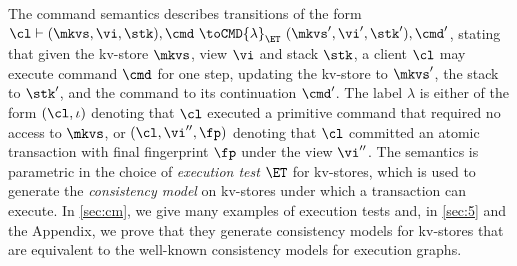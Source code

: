 %
The command semantics describes transitions of the form
$\cl \vdash (\mkvs, \vi, \stk), \cmd \ \toCMD{\lambda}_{\ET} \ (\mkvs', \vi', \stk') ,
\cmd'$, stating that given the kv-store $\mkvs$, view $\vi$ and stack $\stk$, 
a client $\cl$ may execute command $\cmd$ for one step, updating 
the kv-store to $\mkvs'$, the stack to $\stk'$, and the command to its continuation $\cmd'$.
The label $\lambda$ is either of the form $(\cl, \iota)$ denoting that $\cl$ executed a primitive command
that required no access to $\mkvs$, 
or $(\cl, \vi'', \fp)$ denoting that $\cl$ committed an atomic transaction with final fingerprint $\fp$ under the view $\vi''$.
The semantics is parametric in the choice of \emph{execution test}
$\ET$ for kv-stores, which is used to generate 
the \emph{consistency model} on kv-stores
under which a 
transaction can execute.
In \cref{sec:cm}, we give many examples of  execution tests and, in
\cref{sec:5} and the Appendix, we prove that they generate consistency
models for kv-stores that are equivalent to the 
well-known consistency models for  execution graphs. 

